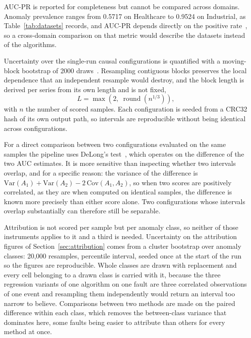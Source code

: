 AUC-PR is reported for completeness but cannot be compared across domains. Anomaly prevalence ranges from 0.5717 on Healthcare to 0.9524 on Industrial, as Table~\ref{tab:datasets} records, and AUC-PR depends directly on the positive rate~\cite{davis2006prroc}, so a cross-domain comparison on that metric would describe the datasets instead of the algorithms.

Uncertainty over the single-run causal configurations is quantified with a moving-block bootstrap of 2000 draws~\cite{kunsch1989blockbootstrap}. Resampling contiguous blocks preserves the local dependence that an independent resample would destroy, and the block length is derived per series from its own length and is not fixed,
\[
  L = \max\!\left(2,\; \operatorname{round}\!\left(n^{1/3}\right)\right),
\]
with $n$ the number of scored samples. Each configuration is seeded from a CRC32 hash of its own output path, so intervals are reproducible without being identical across configurations.

For a direct comparison between two configurations evaluated on the same samples the pipeline uses DeLong's test~\cite{delong1988comparing}, which operates on the difference of the two AUC estimates. It is more sensitive than inspecting whether two intervals overlap, and for a specific reason: the variance of the difference is $\mathrm{Var}(A_1) + \mathrm{Var}(A_2) - 2\,\mathrm{Cov}(A_1, A_2)$, so when two scores are positively correlated, as they are when computed on identical samples, the difference is known more precisely than either score alone. Two configurations whose intervals overlap substantially can therefore still be separable.

Attribution is not scored per sample but per anomaly class, so neither of those instruments applies to it and a third is needed. Uncertainty on the attribution figures of Section~\ref{sec:attribution} comes from a cluster bootstrap over anomaly classes: 20{,}000 resamples, percentile interval, seeded once at the start of the run so the figures are reproducible. Whole classes are drawn with replacement and every cell belonging to a drawn class is carried with it, because the three regression variants of one algorithm on one fault are three correlated observations of one event and resampling them independently would return an interval too narrow to believe. Comparisons between two methods are made on the paired difference within each class, which removes the between-class variance that dominates here, some faults being easier to attribute than others for every method at once.

